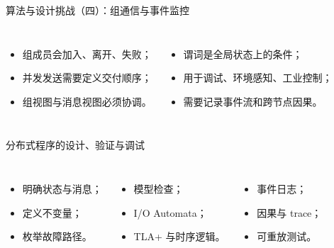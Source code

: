 \documentclass[UTF8,fontset=none,aspectratio=169,10pt]{beamer}
\begin{document}
\begin{frame}{算法与设计挑战（四）：组通信与事件监控}
\begin{columns}[T,onlytextwidth]
\begin{itemize}\item 组成员会加入、离开、失败；\item 并发发送需要定义交付顺序；\item 组视图与消息视图必须协调。\end{itemize}
\begin{itemize}\item 谓词是全局状态上的条件；\item 用于调试、环境感知、工业控制；\item 需要记录事件流和跨节点因果。\end{itemize}\end{columns}
\vfill{}
\end{frame}

\begin{frame}{分布式程序的设计、验证与调试}
\begin{columns}[T,onlytextwidth]
\begin{itemize}\item 明确状态与消息；\item 定义不变量；\item 枚举故障路径。\end{itemize}
\begin{itemize}\item 模型检查；\item I/O Automata；\item TLA+ 与时序逻辑。\end{itemize}
\begin{itemize}\item 事件日志；\item 因果与 trace；\item 可重放测试。\end{itemize}
\end{columns}
\vfill
{}
\end{frame}
\end{document}
